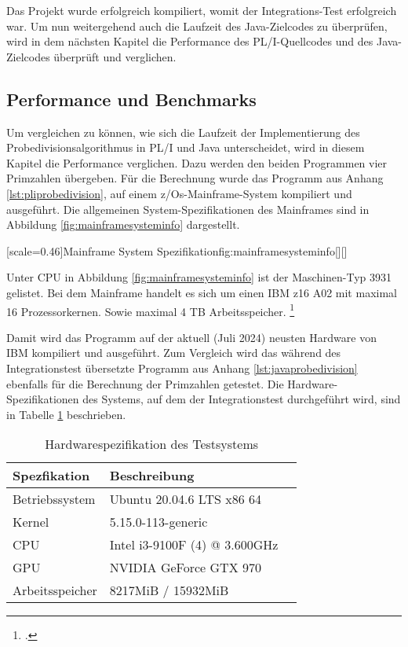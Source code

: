 Das Projekt wurde erfolgreich kompiliert, womit der Integrations-Test erfolgreich war. Um nun weitergehend auch die Laufzeit des Java-Zielcodes zu überprüfen, wird in dem nächsten Kapitel die Performance des PL/I-Quellcodes und des Java-Zielcodes überprüft und verglichen. 
\pagebreak


\subsection{Performance und Benchmarks}
Um vergleichen zu können, wie sich die Laufzeit der Implementierung des Probedivisionsalgorithmus in PL/I und Java unterscheidet, wird in diesem Kapitel die Performance verglichen. 
Dazu werden den beiden Programmen vier Primzahlen übergeben. Für die Berechnung wurde das Programm aus Anhang \ref{lst:pliprobedivision}, auf einem z/Os-Mainframe-System kompiliert und ausgeführt. 
Die allgemeinen System-Spezifikationen des Mainframes sind in Abbildung \ref{fig:mainframesysteminfo} dargestellt.

[scale=0.46]{Mainframe System Spezifikation}{fig:mainframesysteminfo}[][]

Unter CPU in Abbildung \ref{fig:mainframesysteminfo} ist der Maschinen-Typ 3931 gelistet. Bei dem Mainframe handelt es sich um einen IBM z16 A02 mit
maximal 16 Prozessorkernen. Sowie maximal 4 TB Arbeitsspeicher. \footcite{z16}

Damit wird das Programm auf der aktuell (Juli 2024) neusten Hardware von IBM kompiliert und ausgeführt. Zum Vergleich wird das während des Integrationstest übersetzte Programm aus Anhang \ref{lst:javaprobedivision} ebenfalls für die Berechnung der Primzahlen getestet. 
Die Hardware-Spezifikationen des Systems, auf dem der Integrationstest durchgeführt wird, sind in Tabelle \ref{tab:hardwartable} beschrieben.

\begin{table}[h]
	\centering
	\begin{tabularx}{\textwidth}{|X|X|X|}
		\hline
		\textbf{Spezfikation} & \textbf{Beschreibung}  \\
		\hline
		Betriebssystem & Ubuntu 20.04.6 LTS x86 64 \\
		
		Kernel & 5.15.0-113-generic  \\
		
		CPU & Intel i3-9100F (4) @ 3.600GHz \\
		
		GPU & NVIDIA GeForce GTX 970  \\
		
		Arbeitsspeicher & 8217MiB / 15932MiB \\
		\hline
		
	\end{tabularx}
	\caption{Hardwarespezifikation des Testsystems \label{tab:hardwartable}}
\end{table}


